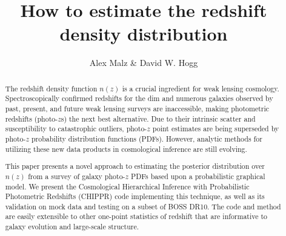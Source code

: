 \documentclass[preprint]{aastex}
\begin{document}
\title{How to estimate the redshift density distribution}

\author{Alex Malz \& David W. Hogg}


\begin{abstract}
The redshift density function $n(z)$ is a crucial ingredient for weak lensing cosmology.  Spectroscopically confirmed redshifts for the dim and numerous galaxies observed by past, present, and future weak lensing surveys are inaccessible, making photometric redshifts (photo-$z$s) the next best alternative.  Due to their intrinsic scatter and susceptibility to catastrophic outliers, photo-$z$ point estimates are being superseded by photo-$z$ probability distribution functions (PDFs).  However, analytic methods for utilizing these new data products in cosmological inference are still evolving.

This paper presents a novel approach to estimating the posterior distribution over $n(z)$ from a survey of galaxy photo-$z$ PDFs based upon a probabilistic graphical model.  We present the Cosmological Hierarchical Inference with Probabilistic Photometric Redshifts (CHIPPR) code implementing this technique, as well as its validation on mock data and testing on a subset of BOSS DR10.  The code and method are easily extensible to other one-point statistics of redshift that are informative to galaxy evolution and large-scale structure.


\end{abstract}
\end{document}
